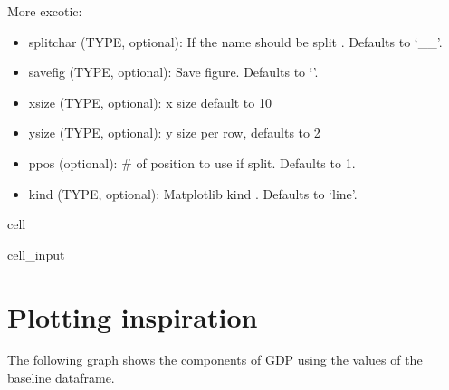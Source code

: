 \documentclass[letterpaper,10pt,english]{jupyterBook}
\begin{document}
\sphinxAtStartPar
More excotic:
\begin{itemize}
\item {} 
\sphinxAtStartPar
splitchar (TYPE, optional): If the name should be split . Defaults to ‘\_\_’.

\item {} 
\sphinxAtStartPar
savefig (TYPE, optional): Save figure. Defaults to ‘’.

\item {} 
\sphinxAtStartPar
xsize  (TYPE, optional): x size default to 10

\item {} 
\sphinxAtStartPar
ysize  (TYPE, optional): y size per row, defaults to 2

\item {} 
\sphinxAtStartPar
ppos (optional): \# of position to use if split. Defaults to \sphinxhyphen{}1.

\item {} 
\sphinxAtStartPar
kind (TYPE, optional): Matplotlib kind . Defaults to ‘line’.

\end{itemize}

\begin{sphinxuseclass}{cell}\begin{sphinxVerbatimInput}

\begin{sphinxuseclass}{cell_input}
\begin{sphinxVerbatim}[commandchars=\\\{\}]
\PYG{p}{[}\PYG{p}{]}  
\end{sphinxVerbatim}

\end{sphinxuseclass}\end{sphinxVerbatimInput}

\end{sphinxuseclass}

\section{Plotting inspiration}
\label{\detokenize{content/notebooks/modelflow_features:plotting-inspiration}}
\sphinxAtStartPar
The following graph shows the components of GDP using the values of the baseline dataframe.
\end{document}
